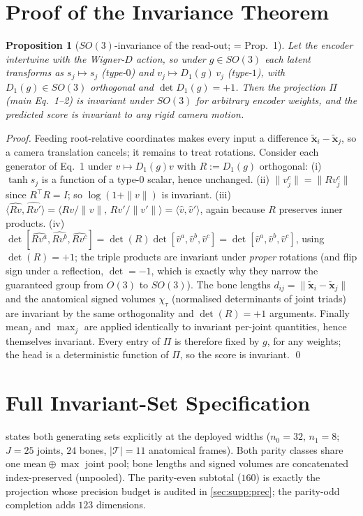 \documentclass[10pt,twocolumn,letterpaper]{article}
\newtheorem{proposition}{Proposition}
\begin{document}
\section{Proof of the Invariance Theorem}\label{sec:supp:proof}
\begin{proposition}[$SO(3)$-invariance of the read-out; = Prop.~1]
Let the encoder intertwine with the Wigner-$D$ action, so under $g\in SO(3)$ each latent transforms as
$s_j\!\mapsto\! s_j$ (type-$0$) and $v_j\!\mapsto\! D_1(g)\,v_j$ (type-$1$), with $D_1(g)\in SO(3)$
orthogonal and $\det D_1(g)=+1$. Then the projection $\Pi$ (main Eq.~1--2) is invariant under $SO(3)$
for arbitrary encoder weights, and the predicted score is invariant to any rigid camera motion.
\end{proposition}
\begin{proof}
Feeding root-relative coordinates makes every input a difference $\tilde{\bm x}_i-\tilde{\bm x}_j$, so a
camera translation cancels; it remains to treat rotations. Consider each generator of Eq.~1 under
$v\mapsto D_1(g)v$ with $R:=D_1(g)$ orthogonal:
(i) $\tanh s_j$ is a function of a type-$0$ scalar, hence unchanged.
(ii) $\|v_j^c\|=\|Rv_j^c\|$ since $R^{\!\top}R=I$; so $\log(1+\|v\|)$ is invariant.
(iii) $\langle\widehat{Rv},\widehat{Rv'}\rangle=\langle Rv/\|v\|,\,Rv'/\|v'\|\rangle=\langle\hat v,\hat v'\rangle$,
again because $R$ preserves inner products.
(iv) $\det[\widehat{Rv^a},\widehat{Rv^b},\widehat{Rv^c}]=\det(R)\det[\hat v^a,\hat v^b,\hat v^c]=\det[\hat v^a,\hat v^b,\hat v^c]$,
using $\det(R)=+1$; the triple products are invariant under \emph{proper} rotations (and flip sign
under a reflection, $\det=-1$, which is exactly why they narrow the guaranteed group from $O(3)$ to
$SO(3)$). The bone lengths $d_{ij}=\|\tilde{\bm x}_i-\tilde{\bm x}_j\|$ and the anatomical signed volumes
$\chi_\tau$ (normalised determinants of joint triads) are invariant by the same orthogonality and
$\det(R)=+1$ arguments. Finally $\mathrm{mean}_j$ and $\max_j$ are applied identically to invariant
per-joint quantities, hence themselves invariant. Every entry of $\Pi$ is therefore fixed by $g$, for
any weights; the head is a deterministic function of $\Pi$, so the score is invariant. \qed
\end{proof}

\section{Full Invariant-Set Specification}\label{sec:supp:cut}
 states both generating sets explicitly at the deployed widths ($n_0{=}32$,
$n_1{=}8$; $J{=}25$ joints, $24$ bones, $|\mathcal T|{=}11$ anatomical frames). Both parity classes share
one $\mathrm{mean}\oplus\max$ joint pool; bone lengths and signed volumes are concatenated
index-preserved (unpooled). The parity-even subtotal ($160$) is exactly the projection whose precision
budget is audited in \cref{sec:supp:prec}; the parity-odd completion adds $123$ dimensions.
\end{document}
